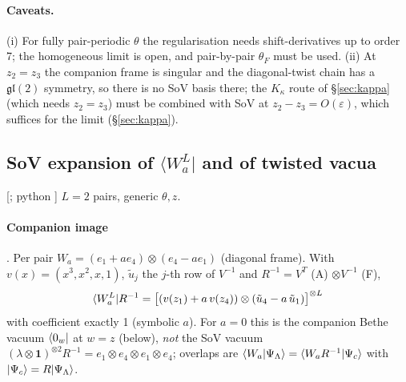 \paragraph{Caveats.} (i) For fully pair-periodic $\theta$ the regularisation needs shift-derivatives up to order 7; the homogeneous limit is open, and pair-by-pair $\theta_F$ must be used. (ii) At $z_2=z_3$ the companion frame
is singular and the diagonal-twist chain has a $\mathfrak{gl}(2)$ symmetry, so there is no SoV basis there; the $K_\kappa$ route of \S\ref{sec:kappa} (which needs $z_2=z_3$) must be combined with SoV at
$z_2-z_3=O(\varepsilon)$, which suffices for the limit (\S\ref{sec:kappa}).

\subsection{SoV expansion of $\langle W_a^L|$ and of twisted vacua}\label{sec:sov-Wa}

[; python ] $L=2$ pairs, generic $\theta,z$.

\paragraph{Companion image} \ex. Per pair $W_a=(e_1+ae_4)\otimes(e_4-ae_1)$ (diagonal frame). With $v(x)=(x^3,x^2,x,1)$, $\tilde u_j$ the $j$-th row of $V^{-1}$ and $R^{-1}=V^T$ (A) $\otimes V^{-1}$ (F),
\begin{equation}
 \langle W_a^{L}|R^{-1}=\big[(v(z_1)+a\,v(z_4))\otimes(\tilde u_4-a\,\tilde u_1)\big]^{\otimes L}
\end{equation}
with coefficient exactly 1 (symbolic $a$). For $a=0$ this is the companion Bethe vacuum $\langle0_w|$ at $w=z$ (below), \emph{not} the SoV vacuum $(\lambda\otimes\mathbf1)^{\otimes2}R^{-1}=e_1\otimes e_4\otimes e_1\otimes e_4$;
overlaps are $\langle W_a|\Psi_\Lambda\rangle=\langle W_aR^{-1}|\Psi_c\rangle$ with $|\Psi_c\rangle=R|\Psi_\Lambda\rangle$.

